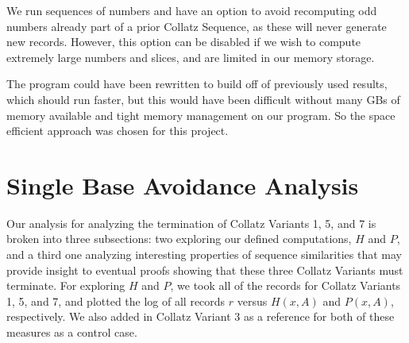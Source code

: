 We run sequences of numbers and have an option to avoid recomputing odd numbers already part of a prior Collatz Sequence, as these will never generate new records. However, this option can be disabled if we wish to compute extremely large numbers and slices, and are limited in our memory storage. \par
The program could have been rewritten to build off of previously used results, which should run faster, but this would have been difficult without many GBs of memory available and tight memory management on our program. So the space efficient approach was chosen for this project.
\section{Single Base Avoidance Analysis} \label{subsec:algsinglebase}
Our analysis for analyzing the termination of Collatz Variants 1, 5, and 7 is broken into three subsections: two exploring our defined computations, $H$ and $P$, and a third one analyzing interesting properties of sequence similarities that may provide insight to eventual proofs showing that these three Collatz Variants must terminate.
For exploring $H$ and $P$, we took all of the records for Collatz Variants 1, 5, and 7, and plotted the log of all records $r$ versus $H(x,A)$ and $P(x,A)$, respectively. We also added in Collatz Variant 3 as a reference for both of these measures as a control case.
